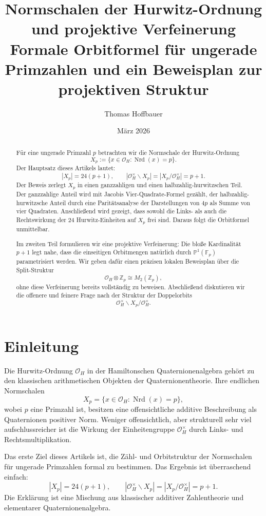 \documentclass[12pt,a4paper]{article}
\title{\textbf{Normschalen der Hurwitz-Ordnung und projektive Verfeinerung}\\
	\large Formale Orbitformel für ungerade Primzahlen und ein Beweisplan zur projektiven Struktur}
\author{Thomas Hoffbauer}
\date{März 2026}
\theoremstyle{plain}
\theoremstyle{definition}
\theoremstyle{remark}
\newcommand{\OH}{\mathcal O_H}
\newcommand{\Z}{\mathbb Z}
\newcommand{\Fp}{\mathbb F_p}
\newcommand{\PP}{\mathbb P}
\newcommand{\nrd}{\operatorname{Nrd}}
\begin{document}
	
	\maketitle
	
	\begin{abstract}
		Für eine ungerade Primzahl \(p\) betrachten wir die Normschale der Hurwitz-Ordnung
		\[
		X_p:=\{x\in \OH:\nrd(x)=p\}.
		\]
		Der Hauptsatz dieses Artikels lautet:
		\[
		|X_p|=24(p+1),
		\qquad
		|\OH^\times\backslash X_p|=|X_p/\OH^\times|=p+1.
		\]
		Der Beweis zerlegt \(X_p\) in einen ganzzahligen und einen halbzahlig-hurwitzschen Teil. Der ganzzahlige Anteil wird mit Jacobis Vier-Quadrate-Formel gezählt, der halbzahlig-hurwitzsche Anteil durch eine Paritätsanalyse der Darstellungen von \(4p\) als Summe von vier Quadraten. Anschließend wird gezeigt, dass sowohl die Links- als auch die Rechtswirkung der \(24\) Hurwitz-Einheiten auf \(X_p\) frei sind. Daraus folgt die Orbitformel unmittelbar.
		
		Im zweiten Teil formulieren wir eine projektive Verfeinerung: Die bloße Kardinalität \(p+1\) legt nahe, dass die einseitigen Orbitmengen natürlich durch \(\PP^1(\Fp)\) parametrisiert werden. Wir geben dafür einen präzisen lokalen Beweisplan über die Split-Struktur
		\[
		\OH\otimes \Z_p \cong M_2(\Z_p),
		\]
		ohne diese Verfeinerung bereits vollständig zu beweisen. Abschließend diskutieren wir die offenere und feinere Frage nach der Struktur der Doppelorbits
		\[
		\OH^\times\backslash X_p/\OH^\times.
		\]
	\end{abstract}
	
	\section{Einleitung}
	
	Die Hurwitz-Ordnung \(\OH\) in der Hamiltonschen Quaternionenalgebra gehört zu den klassischen arithmetischen Objekten der Quaternionentheorie. Ihre endlichen Normschalen
	\[
	X_p=\{x\in\OH:\nrd(x)=p\},
	\]
	wobei \(p\) eine Primzahl ist, besitzen eine offensichtliche additive Beschreibung als Quaternionen positiver Norm. Weniger offensichtlich, aber strukturell sehr viel aufschlussreicher ist die Wirkung der Einheitengruppe \(\OH^\times\) durch Links- und Rechtsmultiplikation.
	
	Das erste Ziel dieses Artikels ist, die Zähl- und Orbitstruktur der Normschalen für ungerade Primzahlen formal zu bestimmen. Das Ergebnis ist überraschend einfach:
	\[
	|X_p|=24(p+1),
	\qquad
	|\OH^\times\backslash X_p|=|X_p/\OH^\times|=p+1.
	\]
	Die Erklärung ist eine Mischung aus klassischer additiver Zahlentheorie und elementarer Quaternionenalgebra.
	
\end{document}
